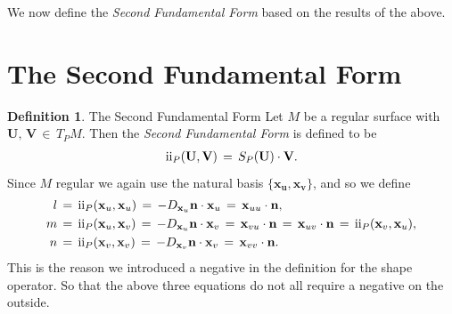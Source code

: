\documentclass{UKZNcomp}
\newcommand{\vect}[1]{\mathbf{#1}} %
\newcommand{\RN}[1]{%
  \textup{\uppercase\expandafter{\romannumeral#1}}%
}
\theoremstyle{definition}
\newtheorem{definition}{Definition}[section]
\theoremstyle{remark}
\begin{document}
We now define the \textit{Second Fundamental Form} based on the results of the above.
\section{The Second Fundamental Form}
\begin{definition}{The Second Fundamental Form}
Let $M$ be a regular surface with $\vect{U},\,\vect{V}\,\in\,T_PM$. Then the \textit{Second Fundamental Form} is defined to be
\begin{align*}
\RN{2}_P(\vect{U},\vect{V})\,=\,S_P(\vect{U})\cdot\vect{V}.
\end{align*}
Since $M$ regular we again use the natural basis $\{\vect{x_{\bm{u}}},\vect{x_{\bm{v}}}\}$, and so we define
\begin{align*}
l\,&=\,\RN{2}_P(\vect x_u,\vect x_u)\,=\,-D_{\vect x_u}\vect n\cdot \vect x_u\,=\,\vect x_{uu}\cdot\vect n,\\
m\,&=\,\RN{2}_P(\vect x_u,\vect x_v)\,=\,-D_{\vect x_u}\vect n\cdot \vect x_v\,=\,\vect x_{vu}\cdot\vect n\,=\,\vect x_{uv}\cdot\vect n\,=\,\RN{2}_P(\vect x_v,\vect x_u),\\
n\,&=\,\RN{2}_P(\vect x_v,\vect x_v)\,=\,-D_{\vect x_v}\vect n\cdot \vect x_v\,=\,\vect x_{vv}\cdot\vect n.\\
\end{align*}
This is the reason we introduced a negative in the definition for the shape operator. So that the above three equations do not all require a negative on the outside.


\end{definition}
\end{document}
